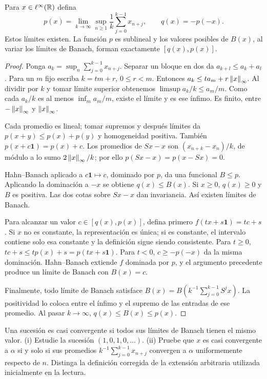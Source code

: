 \begin{lema}\label{v3:banach-limites}
Para $x\in\ell^\infty(\mathbb R)$ defina
\[
 p(x)=\lim_{k\to\infty}\sup_{n\geq1}\frac1k\sum_{j=0}^{k-1}x_{n+j},\qquad q(x)=-p(-x).
\]
Estos límites existen. La función $p$ es sublineal y los valores posibles de $B(x)$, al variar los límites de Banach, forman exactamente $[q(x),p(x)]$.
\end{lema}
\begin{proof}
Ponga $a_k=\sup_n\sum_{j=0}^{k-1}x_{n+j}$. Separar un bloque en dos da $a_{k+l}\leq a_k+a_l$. Para un $m$ fijo escriba $k=tm+r$, $0\leq r<m$. Entonces $a_k\leq ta_m+r\left\lVert x\right\rVert_\infty$. Al dividir por $k$ y tomar límite superior obtenemos $\limsup a_k/k\leq a_m/m$. Como cada $a_k/k$ es al menos $\inf_m a_m/m$, existe el límite y es ese ínfimo. Es finito, entre $-\left\lVert x\right\rVert_\infty$ y $\left\lVert x\right\rVert_\infty$.

Cada promedio es lineal; tomar supremos y después límites da $p(x+y)\leq p(x)+p(y)$ y homogeneidad positiva. También $p(x+c\mathbf1)=p(x)+c$. Los promedios de $Sx-x$ son $(x_{n+k}-x_n)/k$, de módulo a lo sumo $2\left\lVert x\right\rVert_\infty/k$; por ello $p(Sx-x)=p(x-Sx)=0$.

Hahn--Banach aplicado a $c\mathbf1\mapsto c$, dominado por $p$, da una funcional $B\leq p$. Aplicando la dominación a $-x$ se obtiene $q(x)\leq B(x)$. Si $x\geq0$, $q(x)\geq0$ y $B$ es positiva. Las dos cotas sobre $Sx-x$ dan invariancia. Así existen límites de Banach.

Para alcanzar un valor $c\in[q(x),p(x)]$, defina primero $f(tx+s\mathbf1)=tc+s$. Si $x$ no es constante, la representación es única; si es constante, el intervalo contiene solo esa constante y la definición sigue siendo consistente. Para $t\geq0$, $tc+s\leq tp(x)+s=p(tx+s\mathbf1)$. Para $t<0$, $c\geq-p(-x)$ da la misma dominación. Hahn--Banach extiende $f$ dominada por $p$, y el argumento precedente produce un límite de Banach con $B(x)=c$.

Finalmente, todo límite de Banach satisface $B(x)=B(k^{-1}\sum_{j=0}^{k-1}S^jx)$. La positividad lo coloca entre el ínfimo y el supremo de las entradas de ese promedio. Al pasar $k\to\infty$, $q(x)\leq B(x)\leq p(x)$.
\end{proof}

\begin{ejercicio}\label{ej:v3-l01-5}
Una sucesión es casi convergente si todos sus límites de Banach tienen el mismo valor. (i) Estudie la sucesión $(1,0,1,0,\ldots)$. (ii) Pruebe que $x$ es casi convergente a $\alpha$ si y solo si sus promedios $k^{-1}\sum_{j=0}^{k-1}x_{n+j}$ convergen a $\alpha$ uniformemente respecto de $n$. Distinga la definición corregida de la extensión arbitraria utilizada inicialmente en la lectura.
\end{ejercicio}


